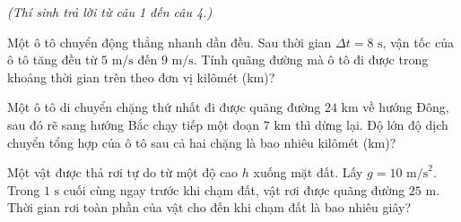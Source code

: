 \vspace{0.15cm}
\begin{flushleft}
	{\color{blue!50!green}}
	\textit{\small (Thí sinh trả lời từ câu 1 đến câu 4.)}
\end{flushleft}
\setcounter{ex}{0}
\setcounter{bt}{0}

\begin{ex}
	Một ô tô chuyển động thẳng nhanh dần đều. Sau thời gian $\Delta t = 8\text{ s}$, vận tốc của ô tô tăng đều từ $5\text{ m/s}$ đến $9\text{ m/s}$. Tính quãng đường mà ô tô đi được trong khoảng thời gian trên theo đơn vị kilômét (km)?
	\par{}
\end{ex}

\begin{ex}
	Một ô tô di chuyển chặng thứ nhất đi được quãng đường $24\text{ km}$ về hướng Đông, sau đó rẽ sang hướng Bắc chạy tiếp một đoạn $7\text{ km}$ thì dừng lại. Độ lớn độ dịch chuyển tổng hợp của ô tô sau cả hai chặng là bao nhiêu kilômét (km)?
	\par{}
\end{ex}

\begin{ex}
	Một vật được thả rơi tự do từ một độ cao $h$ xuống mặt đất. Lấy $g = 10\text{ m/s}^2$. Trong $1\text{ s}$ cuối cùng ngay trước khi chạm đất, vật rơi được quãng đường $25\text{ m}$. Thời gian rơi toàn phần của vật cho đến khi chạm đất là bao nhiêu giây?
	\par{}
\end{ex}

